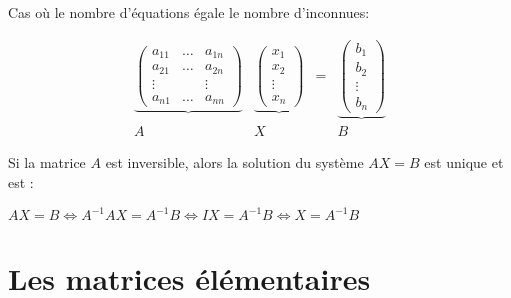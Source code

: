 \begin{frame}

Cas où le nombre d'équations égale le nombre d'inconnues:

\begin{equation*}\begin{array}{cccc}
\underbrace{
\left(
\begin{array}{ccc}
a_{11} & \dots & a_{1n}\\
a_{21} & \dots & a_{2n}\\
\vdots &&\vdots\\
a_{n1} &\dots & a_{nn}
\end{array}
\right)
}
&
\underbrace{
\left(
\begin{array}{c}
x_1\\
x_2\\
\vdots\\
x_n
\end{array}
\right)
}
& = &
\underbrace{
\left(
\begin{array}{c}
b_1\\
b_2\\
\vdots\\
b_n
\end{array}
\right)
} 
\\
A & X & & B
\end{array}\end{equation*}

\pause

\begin{proposition}
Si la matrice $A$ est inversible, alors
la solution du système $AX=B$ est unique et est :
\end{proposition}

\pause

$AX= B \iff A^{-1}AX = A^{-1}B \iff I X = A^{-1}B\iff X = A^{-1}B$


\end{frame}




\section{Les matrices élémentaires}

